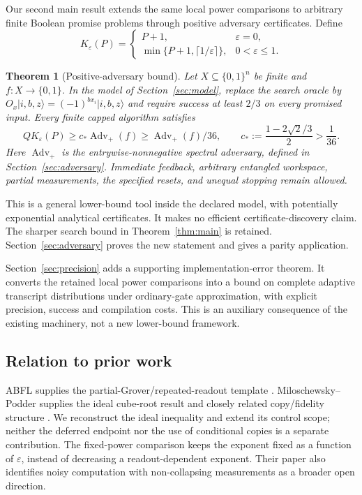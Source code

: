 \documentclass[11pt]{article}
\newtheorem{theorem}{Theorem}
\theoremstyle{remark}
\newcommand{\eps}{\varepsilon}
\newcommand{\ket}[1]{\lvert #1\rangle}
\begin{document}
Our second main result extends the same local power comparisons to
arbitrary finite Boolean promise problems through positive adversary
certificates. Define
\[
 K_\eps(P)=
 \begin{cases}
 P+1,&\eps=0,\\
 \min\{P+1,\lceil1/\eps\rceil\},&0<\eps\le1.
 \end{cases}
\]
\begin{theorem}[Positive-adversary bound]\label{thm:adversary}
Let $X\subseteq\{0,1\}^n$ be finite and $f:X\to\{0,1\}$.
In the model of Section~\ref{sec:model}, replace the search oracle by
$O_x\ket{i,b,z}=(-1)^{b x_i}\ket{i,b,z}$ and require success at least $2/3$
on every promised input. Every finite capped algorithm satisfies
\begin{equation}\label{eq:adversary-main}
 QK_\eps(P)\ge c_*\operatorname{Adv}_{+}(f)
 \ge \operatorname{Adv}_{+}(f)/36,
 \qquad c_*:=\frac{1-2\sqrt2/3}{2}>\frac1{36}.
\end{equation}
Here $\operatorname{Adv}_{+}$ is the entrywise-nonnegative spectral
adversary, defined in Section~\ref{sec:adversary}. Immediate feedback,
arbitrary entangled workspace, partial measurements, the specified resets,
and unequal stopping remain allowed.
\end{theorem}

This is a general lower-bound tool inside the declared model, with
potentially exponential analytical certificates. It makes no efficient
certificate-discovery claim. The sharper search bound in
Theorem~\ref{thm:main} is retained. Section~\ref{sec:adversary} proves the
new statement and gives a parity application.

Section~\ref{sec:precision} adds a supporting implementation-error theorem.
It converts the retained local power comparisons into a bound on complete
adaptive transcript distributions under ordinary-gate approximation, with
explicit precision, success and compilation costs. This is an auxiliary
consequence of the existing machinery, not a new lower-bound framework.

\subsection{Relation to prior work}
ABFL supplies the partial-Grover/repeated-readout template \cite{abfl}.
Miloschewsky--Podder supplies the ideal cube-root result and closely related
copy/fidelity structure \cite{mp}. We reconstruct the ideal inequality and
extend its control scope; neither the deferred endpoint nor the use of
conditional copies is a separate contribution. The fixed-power comparison keeps
the exponent fixed as a function of $\eps$, instead of decreasing a
readout-dependent exponent. Their paper also identifies noisy computation
with non-collapsing measurements as a broader open direction.
\end{document}
